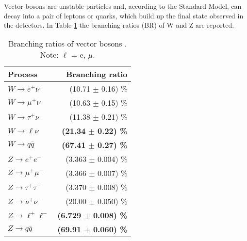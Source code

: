 Vector bosons are unstable particles and, according to the Standard Model, can decay into a pair of leptons or quarks,
which build up the final state observed in the detectors.
In Table \ref{tab:VB-BR} the branching ratios (BR) of W and Z are reported.

\begin{table}
  \centering
  \caption{Branching ratios of vector bosons \cite{Workman:2022ynf}. Note: $\ell$ = e, $\mu$.}
  \label{tab:VB-BR}
  \begin{tabular}{ l r } %
    \hline
    Process & Branching ratio \\
    \hline
    $W \rightarrow e^+ \nu               $ &         (10.71 $\pm$ 0.16) \% \\
    $W \rightarrow \mu^+ \nu             $ &         (10.63 $\pm$ 0.15) \% \\
    $W \rightarrow \tau^+ \nu            $ &         (11.38 $\pm$ 0.21) \% \\
    \boldmath$W \rightarrow \ell \nu     $ & \textbf{(21.34 $\pm$ 0.22) \%}\\
    \boldmath$W \rightarrow q\bar{q}     $ & \textbf{(67.41 $\pm$ 0.27) \%}\\
    \hline
    $Z \rightarrow e^+ e^-               $ &         (3.363 $\pm$ 0.004) \% \\
    $Z \rightarrow \mu^+ \mu^-           $ &         (3.366 $\pm$ 0.007) \% \\
    $Z \rightarrow \tau^+ \tau^-         $ &         (3.370 $\pm$ 0.008) \% \\
    $Z \rightarrow \nu^+ \nu^-           $ &         (20.00 $\pm$ 0.050) \% \\
    \boldmath$Z \rightarrow \ell^+ \ell^-$ & \textbf{(6.729 $\pm$ 0.008) \%}\\
    \boldmath$Z \rightarrow q\bar{q}     $ & \textbf{(69.91 $\pm$ 0.060) \%}\\
    \hline
  \end{tabular}
\end{table}

